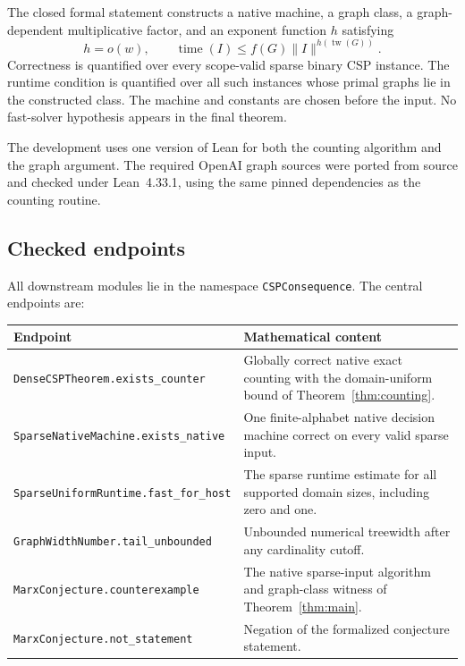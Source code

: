 \documentclass[11pt,reqno]{amsart}
\numberwithin{equation}{section}
\theoremstyle{definition}
\theoremstyle{remark}
\newcommand{\tw}{\operatorname{tw}}
\begin{document}
The closed formal statement constructs a native machine, a graph class, a graph-dependent multiplicative factor, and an exponent function $h$ satisfying
\[
 h=o(w),\qquad
 \operatorname{time}(I)\le f(G)\lVert I\rVert^{h(\tw(G))}.
\]
Correctness is quantified over every scope-valid sparse binary CSP instance. The runtime condition is quantified over all such instances whose primal graphs lie in the constructed class. The machine and constants are chosen before the input. No fast-solver hypothesis appears in the final theorem.

The development uses one version of Lean for both the counting algorithm and the graph argument. The required OpenAI graph sources were ported from source and checked under Lean~4.33.1, using the same pinned dependencies as the counting routine.

\subsection{Checked endpoints}

All downstream modules lie in the namespace \texttt{CSPConsequence}. The central endpoints are:
\begin{center}
\small
\begin{tabular}{@{}p{}p{}@{}}
\toprule
Endpoint & Mathematical content\\
\midrule
\texttt{DenseCSPTheorem.}\allowbreak\texttt{exists\_counter}
 & Globally correct native exact counting with the domain-uniform bound of Theorem~\ref{thm:counting}.\\[3pt]
\texttt{SparseNativeMachine.}\allowbreak\texttt{exists\_native}
 & One finite-alphabet native decision machine correct on every valid sparse input.\\[3pt]
\texttt{SparseUniformRuntime.}\allowbreak\texttt{fast\_for\_host}
 & The sparse runtime estimate for all supported domain sizes, including zero and one.\\[3pt]
\texttt{GraphWidthNumber.}\allowbreak\texttt{tail\_unbounded}
 & Unbounded numerical treewidth after any cardinality cutoff.\\[3pt]
\texttt{MarxConjecture.}\allowbreak\texttt{counterexample}
 & The native sparse-input algorithm and graph-class witness of Theorem~\ref{thm:main}.\\[3pt]
\texttt{MarxConjecture.}\allowbreak\texttt{not\_statement}
 & Negation of the formalized conjecture statement.\\
\bottomrule
\end{tabular}
\end{center}
\end{document}

